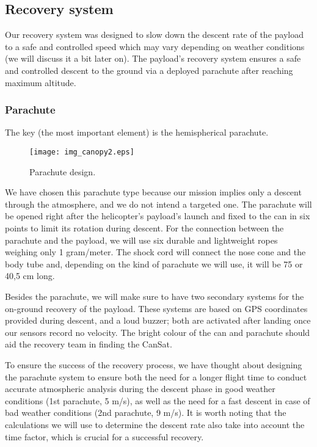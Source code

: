 
\subsection{Recovery system}
Our recovery system was designed to slow down the descent rate of the payload to a safe and controlled speed which may vary depending on weather conditions (we will discuss it a bit later on). The payload’s recovery system ensures a safe and controlled descent to the ground via a deployed parachute after reaching maximum altitude.

\subsubsection{Parachute}

The key (the most important element) is the hemispherical parachute. 
\begin{wrapfigure}{l}{0.26\textwidth}
    \centering
    \texttt{[image: img\_canopy2.eps]}
    \caption{\small{Parachute design.}}
    \label{fig:software_fiagram}
\end{wrapfigure}
We have chosen this parachute type because our mission implies only a descent through the atmosphere, and we do not intend a targeted one. The parachute will be opened right after the helicopter’s payload’s launch and fixed to the can in six points to limit its rotation during descent. For the connection between the parachute and the payload, we will use six durable and lightweight ropes weighing only 1 gram/meter. The shock cord will connect the nose cone and the body tube and, depending on the kind of parachute we will use, it will be 75 or 40,5 cm long. 

Besides the parachute, we will make sure to have two secondary systems for the on-ground recovery of the payload. These systems are based on GPS coordinates provided during descent, and a loud buzzer; both are activated after landing once our sensors record no velocity. The bright colour of the can and parachute should aid the recovery team in finding the CanSat.      

To ensure the success of the recovery process, we have thought about designing the parachute system to ensure both the need for a longer flight time to conduct accurate atmospheric analysis during the descent phase in good weather conditions (1st parachute, 5 m/s), as well as the need for a fast descent in case of bad weather conditions (2nd parachute, 9 m/s). It is worth noting that the calculations we will use to determine the descent rate also take into account the time factor, which is crucial for a successful recovery.

